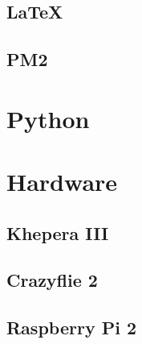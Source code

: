 \subsection{\LaTeX}
\subsection{PM2}
\section{Python}
\section{Hardware}
\subsection{Khepera III}
\subsection{Crazyflie 2}
\subsection{Raspberry Pi 2}
